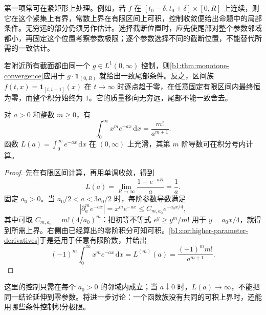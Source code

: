 第一项常可在紧矩形上处理。例如，若 \(f\) 在 \([t_0-\delta,t_0+\delta]\times[0,R]\) 上连续，则它在这个紧集上有界，常数上界在有限区间上可积，控制收敛便给出命题中的局部条件。无穷远的部分仍须另作估计。选择截断位置时，应先使尾部对整个参数邻域都小，再固定这个位置考察参数极限；逐个参数选择不同的截断位置，不能替代所需的一致估计。

\ProseParagraphBreak

若附近所有截面都由同一个 \(g\in L^1(0,\infty)\) 控制，则\cref{b1:thm:monotone-convergence}应用于 \(g\cdot\mathbf1_{(0,R)}\) 就给出一致尾部条件。反之，区间族 \(f(t,x)=\mathbf1_{[t,t+1]}(x)\) 在 \(t\to\infty\) 时逐点趋于零，在任意固定有限区间内最终恒为零，而整个积分始终为 \(1\)。它的质量移向无穷远，尾部不能一致舍去。

\begin{proposition}
\label{b1:prop:laplace-exponential-moments}
对 \(a>0\) 和整数 \(m\geq0\)，有
\[
\int_0^\infty x^m e^{-ax}\,\mathrm dx=\dfrac{m!}{a^{m+1}}.
\]
函数 \(L(a)=\int_0^\infty e^{-ax}\,\mathrm dx\) 在 \((0,\infty)\) 上光滑，其第 \(m\) 阶导数可在积分号内计算。
\end{proposition}
\begin{proof}
先在有限区间计算，再用单调收敛，得到
\[
L(a)=\lim_{R\to\infty}\dfrac{1-e^{-aR}}{a}=\dfrac1a.
\]
固定 \(a_0>0\)。当 \(a_0/2<a<3a_0/2\) 时，每阶参数导数满足
\[
|\partial_a^m e^{-ax}|=x^m e^{-ax}
\leq C_{m,a_0}e^{-a_0x/4},
\]
其中可取 \(C_{m,a_0}=m!(4/a_0)^m\)：把初等不等式 \(e^y\geq y^m/m!\) 用于 \(y=a_0x/4\)，就得到所需上界。右侧由已经算出的零阶积分可知可积。\cref{b1:cor:higher-parameter-derivatives}于是适用于任意有限阶数，并给出
\[
(-1)^m\int_0^\infty x^m e^{-ax}\,\mathrm dx
=L^{(m)}(a)=\dfrac{(-1)^m m!}{a^{m+1}}.
\]
\end{proof}

这里的控制只需在每个 \(a_0>0\) 的邻域内成立；当 \(a\downarrow0\) 时，\(L(a)\to\infty\)，不能把同一结论延伸到零参数。将进一步讨论：一个函数族没有共同的可积上界时，还能用哪些条件控制积分极限。
